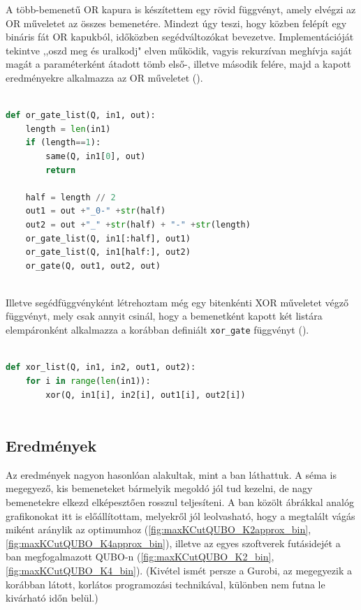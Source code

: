 A több-bemenetű OR kapura is készítettem egy rövid függvényt, amely elvégzi az OR műveletet az összes bemenetére. Mindezt úgy teszi, hogy közben felépít egy bináris fát OR kapukból, időközben segédváltozókat bevezetve. Implementációját tekintve ,,oszd meg és uralkodj" elven működik, vagyis rekurzívan meghívja saját magát a paraméterként átadott tömb első-, illetve második felére, majd a kapott eredményekre alkalmazza az OR műveletet ().

\begin{lstlisting}[language=python,caption=Sokbemenetes OR kapu,label=code:MultipleOrGates]
	
def or_gate_list(Q, in1, out):
	length = len(in1)
	if (length==1):
		same(Q, in1[0], out)
		return
	
	half = length // 2
	out1 = out +"_0-" +str(half)  
	out2 = out +"_" +str(half) + "-" +str(length)
	or_gate_list(Q, in1[:half], out1)
	or_gate_list(Q, in1[half:], out2)
	or_gate(Q, out1, out2, out)
	
\end{lstlisting}

Illetve segédfüggvényként létrehoztam még egy bitenkénti XOR műveletet végző függvényt, mely csak annyit csinál, hogy a bemenetként kapott két listára elempáronként alkalmazza a korábban definiált \verb+xor_gate+ függvényt ().

\begin{lstlisting}[language=python,caption=Bitenkénti XOR művelet,label=code:XorGateList]
	
def xor_list(Q, in1, in2, out1, out2):
	for i in range(len(in1)):
		xor(Q, in1[i], in2[i], out1[i], out2[i])
	
\end{lstlisting}

\subsection{Eredmények}

Az eredmények nagyon hasonlóan alakultak, mint a ban láthattuk. A séma is megegyező, kis bemeneteket bármelyik megoldó jól tud kezelni, de nagy bemenetekre elkezd elképesztően rosszul teljesíteni. A ban közölt ábrákkal analóg grafikonokat itt is előállítottam, melyekről jól leolvasható, hogy a megtalált vágás miként aránylik az optimumhoz (\ref{fig:maxKCutQUBO_K2approx_bin}, \ref{fig:maxKCutQUBO_K4approx_bin}), illetve az egyes szoftverek futásidejét a ban megfogalmazott QUBO-n (\ref{fig:maxKCutQUBO_K2_bin}, \ref{fig:maxKCutQUBO_K4_bin}). (Kivétel ismét persze a Gurobi, az megegyezik a korábban látott, korlátos programozási technikával, különben nem futna le kivárható időn belül.)


